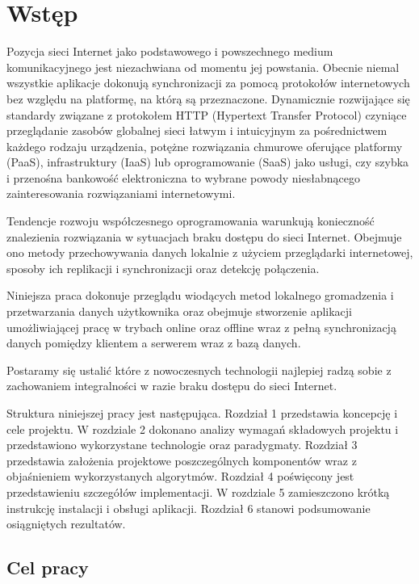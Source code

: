 \chapter{Wstęp}
\label{cha:wstep}

Pozycja sieci Internet jako podstawowego i powszechnego medium komunikacyjnego jest niezachwiana od momentu jej powstania. Obecnie niemal wszystkie aplikacje dokonują synchronizacji za pomocą protokołów internetowych bez względu na platformę, na którą są przeznaczone. Dynamicznie rozwijające się standardy związane z protokołem HTTP (Hypertext Transfer Protocol) czyniące przeglądanie zasobów globalnej sieci łatwym i intuicyjnym za pośrednictwem każdego rodzaju urządzenia, potężne rozwiązania chmurowe oferujące platformy (PaaS), infrastruktury (IaaS) lub oprogramowanie (SaaS) jako usługi, czy szybka i przenośna bankowość elektroniczna to wybrane powody niesłabnącego zainteresowania rozwiązaniami internetowymi.

Tendencje rozwoju współczesnego oprogramowania warunkują konieczność znalezienia rozwiązania w sytuacjach braku dostępu do sieci Internet. Obejmuje ono metody przechowywania danych lokalnie z użyciem przeglądarki internetowej, sposoby ich replikacji i synchronizacji oraz detekcję połączenia.

Niniejsza praca dokonuje przeglądu wiodących metod lokalnego gromadzenia i przetwarzania danych użytkownika oraz obejmuje stworzenie aplikacji umożliwiającej pracę w trybach online oraz offline wraz z pełną synchronizacją danych pomiędzy klientem a serwerem wraz z bazą danych.

Postaramy się ustalić które z nowoczesnych technologii najlepiej radzą sobie z zachowaniem integralności w razie braku dostępu do sieci Internet.

Struktura niniejszej pracy jest następująca. Rozdział 1 przedstawia koncepcję i cele projektu. W rozdziale 2 dokonano analizy wymagań składowych projektu i przedstawiono wykorzystane technologie oraz paradygmaty. Rozdział 3 przedstawia założenia projektowe poszczególnych komponentów wraz z objaśnieniem wykorzystanych algorytmów. Rozdział 4 poświęcony jest przedstawieniu szczegółów implementacji. W rozdziale 5 zamieszczono krótką instrukcję instalacji i obsługi aplikacji. Rozdział 6 stanowi podsumowanie osiągniętych rezultatów.

\section{Cel pracy}
\label{sec:celPracy}

